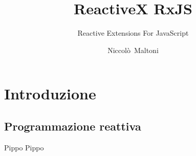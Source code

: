 
\title[RxJS]{ReactiveX RxJS}
\subtitle{Reactive Extensions For JavaScript}
\author[Niccolò~Maltoni]{\large{Niccolò~Maltoni}}
\date[30 maggio 2018]{}


    \begin{frame}[c]
        \titlepage
    \end{frame}

    \section{Introduzione}\label{sec:intro}
        \subsection{Programmazione reattiva}\label{subsec:react}
        \begin{frame}{\insertsectionhead}
            \begin{block}{Pippo}
                Pippo
            \end{block}
        \end{frame}

